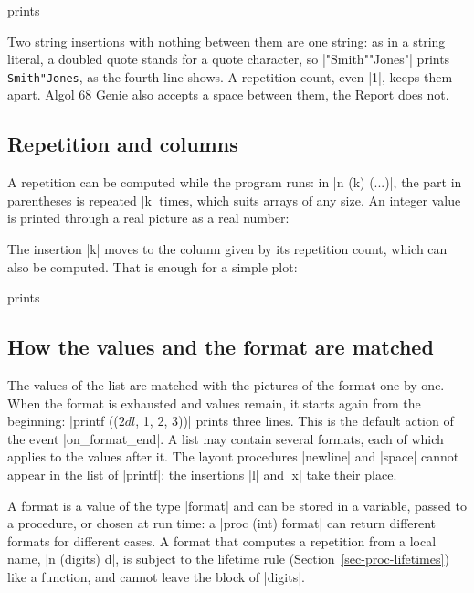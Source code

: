 
\noindent prints

\begin{pitfall}
Two string insertions with nothing between them are one string: as in a
string literal, a doubled quote stands for a quote character, so
\code|"Smith""Jones"| prints \texttt{Smith"Jones}, as the fourth line
shows. A repetition count, even \code|1|, keeps them apart. Algol 68
Genie also accepts a space between them, the Report does not.
\end{pitfall}

\subsection*{Repetition and columns}

A repetition can be computed while the program runs: in
\code|n (k) (...)|, the part in parentheses is repeated \code|k| times,
which suits arrays of any size. An integer value is printed through a
real picture as a real number:


The insertion \code|k| moves to the column given by its repetition
count, which can also be computed. That is enough for a simple plot:


\noindent prints

\subsection*{How the values and the format are matched}\label{sec-format-list}

The values of the list are matched with the pictures of the format one
by one. When the format is exhausted and values remain, it starts again
from the beginning: \code|printf (($2d l$, 1, 2, 3))| prints three lines.
This is the default action of the event \code|on_format_end|. A list may
contain several formats, each of which applies to the values after it.
The layout procedures \code|newline| and \code|space| cannot appear in
the list of \code|printf|; the insertions \code|l| and \code|x| take
their place.

A format is a value of the type \code|format| and can be stored in a
variable, passed to a procedure, or chosen at run time: a
\code|proc (int) format| can return different formats for different
cases. A format that computes a repetition from a local name,
\code|n (digits) d|, is subject to the lifetime rule
(Section~\ref{sec-proc-lifetimes}) like a function, and cannot leave the
block of \code|digits|.

